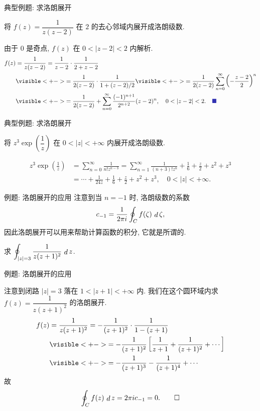 \begin{frame}{典型例题: 求洛朗展开}
\begin{example}
将 $f(z)=\dfrac1{z(z-2)}$ 在 $2$ 的去心邻域内展开成洛朗级数.
\end{example}
\begin{solutions}
由于 $0$ 是奇点, $f(z)$ 在 $0<|z-2|<2$ 内解析.
\onslide<+->
\begin{align*}
f(z)&=\frac1{z(z-2)}=\frac1{z-2}\cdot\frac1{2+z-2}\\
&\visible<+->{=\frac1{2(z-2)}\cdot\frac1{1+(z-2)/2}}
\visible<+->{=\frac1{2(z-2)}\sum_{n=0}^\infty\left(-\frac{z-2}2\right)^n}\\
&\visible<+->{=\frac1{2(z-2)}+\sum_{n=0}^\infty\frac{(-1)^{n+1}}{2^{n+2}}(z-2)^n,\quad 0<|z-2|<2.\mqed}
\end{align*}
\end{solutions}
\end{frame}


\begin{frame}{典型例题: 求洛朗展开}
\begin{exercise}
将 $z^3\exp\left(\dfrac1z\right)$ 在 $0<|z|<+\infty$ 内展开成洛朗级数.
\end{exercise}
\begin{answer}
\vspace{-\baselineskip}
\begin{align*}
z^3\exp\left(\frac1z\right)&=\sum_{n=0}^\infty\frac{1}{n!z^{n-3}}
=\sum_{n=1}^\infty\frac1{(n+3)! z^n}+\frac16+\frac z2+z^2+z^3\\
&=\cdots+\frac1{24z}+\frac16+\frac z2+z^2+z^3,\quad 0<|z|<+\infty.
\end{align*}
\end{answer}
\end{frame}


\begin{frame}{例题: 洛朗展开的应用}
\onslide<+->
注意到当 $n=-1$ 时, 洛朗级数的系数
\[c_{-1}=\frac1{2\pi i}\oint_C f(\zeta)\,\mathop{d}\zeta,\]
\onslide<+->
因此洛朗展开可以用来帮助计算函数的积分,
\onslide<+->
它就是所谓的.
\begin{example}
求 $\displaystyle\oint_{|z|=3}\frac1{z(z+1)^2}\,\mathop{d} z$.
\end{example}
\end{frame}


\begin{frame}{例题: 洛朗展开的应用}
\begin{solution}
注意到闭路 $|z|=3$ 落在 $1<|z+1|<+\infty$ 内.
\onslide<+->
我们在这个圆环域内求 $f(z)=\dfrac1{z(z+1)^2}$ 的洛朗展开.
\onslide<+->
\vspace{-\baselineskip}
\begin{align*}
f(z)&=\frac1{z(z+1)^2}=-\frac1{(z+1)^2}\cdot\frac1{1-(z+1)}\\
&\visible<+->{=-\frac1{(z+1)^2}\left[\frac1{z+1}+\frac1{(z+1)^2}+\cdots\right]}\\
&\visible<+->{=-\frac1{(z+1)^3}-\frac1{(z+1)^4}+\cdots}
\end{align*}
\onslide<+->
故
\[\oint_Cf(z)\,\mathop{d} z=2\pi i c_{-1}=0.\qedhere\]
\end{solution}
\end{frame}


